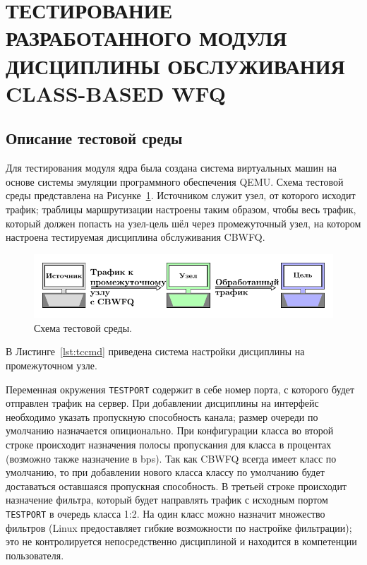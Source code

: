 \section{ТЕСТИРОВАНИЕ РАЗРАБОТАННОГО МОДУЛЯ ДИСЦИПЛИНЫ ОБСЛУЖИВАНИЯ CLASS-BASED WFQ}

	\subsection{Описание тестовой среды}

		Для тестирования модуля ядра была создана система виртуальных машин на основе
		системы эмуляции программного обеспечения QEMU. Схема тестовой среды представлена
		на Рисунке~\ref{pic:testscheme}. Источником служит узел, от которого исходит трафик;
		траблицы маршрутизации настроены таким образом, чтобы весь трафик, который
		должен попасть на узел-цель шёл через промежуточный узел, на котором
		настроена тестируемая дисциплина обслуживания CBWFQ.

        \begin{figure}[ht!]
        	\center
        	\includegraphics[scale=1.2]{pdfimages/test_scheme.pdf}
        	\caption{Схема тестовой среды.}
			\label{pic:testscheme}
        \end{figure}

		В Листинге~\ref{lst:tccmd} приведена система настройки дисциплины на промежуточном узле.

		Переменная окружения \lstinline{TESTPORT} содержит в себе номер порта,
		с которого будет отправлен трафик на сервер. При добавлении дисциплины
		на интерфейс необходимо указать пропускную способность канала; размер
		очереди по умолчанию назначается опиционально. При конфигурации класса
		во второй строке происходит назначения полосы пропускания для класса
		в процентах (возможно также назначение в bps).
        Так как CBWFQ всегда имеет класс по умолчанию, то
		при добавлении нового класса классу по умолчанию будет доставаться
		оставшаяся пропускная способность.
        В третьей строке происходит
		назначение фильтра, который будет направлять трафик с исходным портом \lstinline{TESTPORT}
		в очередь класса 1:2. На один класс можно назначит множество фильтров
		(Linux предоставляет гибкие возможности по настройке фильтрации); это не
		контролируется непосредственно дисциплиной и находится в компетенции
		пользователя. 

